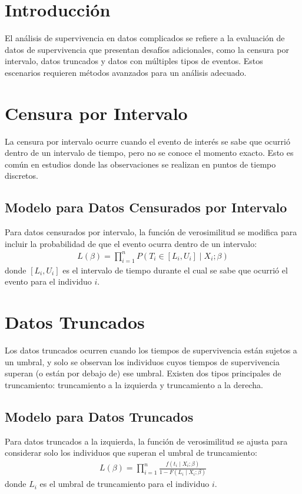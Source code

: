 \documentclass[a4paper]{report} %
\begin{document}
\section{Introducci\'on}
El an\'alisis de supervivencia en datos complicados se refiere a la evaluaci\'on de datos de supervivencia que presentan desaf\'ios adicionales, como la censura por intervalo, datos truncados y datos con m\'ultiples tipos de eventos. Estos escenarios requieren m\'etodos avanzados para un an\'alisis adecuado.

\section{Censura por Intervalo}
La censura por intervalo ocurre cuando el evento de inter\'es se sabe que ocurri\'o dentro de un intervalo de tiempo, pero no se conoce el momento exacto. Esto es com\'un en estudios donde las observaciones se realizan en puntos de tiempo discretos.

\subsection{Modelo para Datos Censurados por Intervalo}
Para datos censurados por intervalo, la funci\'on de verosimilitud se modifica para incluir la probabilidad de que el evento ocurra dentro de un intervalo:
\begin{eqnarray*}
L(\beta) = \prod_{i=1}^n P(T_i \in [L_i, U_i] \mid X_i; \beta)
\end{eqnarray*}
donde $[L_i, U_i]$ es el intervalo de tiempo durante el cual se sabe que ocurri\'o el evento para el individuo $i$.

\section{Datos Truncados}
Los datos truncados ocurren cuando los tiempos de supervivencia est\'an sujetos a un umbral, y solo se observan los individuos cuyos tiempos de supervivencia superan (o est\'an por debajo de) ese umbral. Existen dos tipos principales de truncamiento: truncamiento a la izquierda y truncamiento a la derecha.

\subsection{Modelo para Datos Truncados}
Para datos truncados a la izquierda, la funci\'on de verosimilitud se ajusta para considerar solo los individuos que superan el umbral de truncamiento:
\begin{eqnarray*}
L(\beta) = \prod_{i=1}^n \frac{f(t_i \mid X_i; \beta)}{1 - F(L_i \mid X_i; \beta)}
\end{eqnarray*}
donde $L_i$ es el umbral de truncamiento para el individuo $i$.
\end{document}
